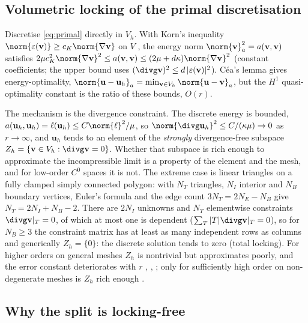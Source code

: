 \documentclass[11pt]{article}
\numberwithin{equation}{section}
\theoremstyle{remark}
\newcommand{\eps}{\varepsilon}
\newcommand{\vu}{\mathbf{u}}
\newcommand{\vv}{\mathbf{v}}
\newcommand{\Vh}{V_h}
\begin{document}
\subsection{Volumetric locking of the primal discretisation}
\label{sec:locking}

Discretise \eqref{eq:primal} directly in $\Vh$. With Korn's inequality
$\norm{\eps(\vv)}\ge c_K\norm{\nabla\vv}$ on $V$
\cite[\S11.2]{BrennerScott}, the energy norm $\norm{\vv}_a^2 = a(\vv,\vv)$
satisfies $2\mu c_K^2\norm{\nabla\vv}^2\le a(\vv,\vv)\le(2\mu +
d\kappa)\norm{\nabla\vv}^2$ (constant coefficients; the upper bound uses
$(\divg\vv)^2\le d\,|\eps(\vv)|^2$). Céa's lemma gives energy-optimality,
$\norm{\vu - \vu_h}_a = \min_{\vv\in\Vh}\norm{\vu - \vv}_a$, but the
$H^1$ quasi-optimality constant is the ratio of these bounds, $O(r)$.

The mechanism is the divergence constraint. The discrete energy is
bounded, $a(\vu_h,\vu_h) = \ell(\vu_h)\le C\norm{\ell}^2/\mu$, so
$\norm{\divg\vu_h}^2\le C/(\kappa\mu)\to0$ as $r\to\infty$, and $\vu_h$
tends to an element of the \emph{strongly} divergence-free subspace $Z_h =
\{\vv\in\Vh : \divg\vv = 0\}$. Whether that subspace is rich enough to
approximate the incompressible limit is a property of the element and the
mesh, and for low-order $C^0$ spaces it is not. The extreme case is linear
triangles on a fully clamped simply connected polygon: with $N_T$
triangles, $N_I$ interior and $N_B$ boundary vertices, Euler's formula and
the edge count $3N_T = 2N_E - N_B$ give $N_T = 2N_I + N_B - 2$. There are
$2N_I$ unknowns and $N_T$ elementwise constraints $\divg\vv|_T = 0$, of
which at most one is dependent ($\sum_T|T|\divg\vv|_T = 0$), so for
$N_B\ge3$ the constraint matrix has at least as many independent rows as
columns and generically $Z_h = \{0\}$: the discrete solution tends to zero
(total locking). For higher orders on general meshes $Z_h$ is nontrivial
but approximates poorly, and the error constant deteriorates with $r$
\cite{BabuskaSuri1992}, \cite[\S11.3]{BrennerScott}, \cite[Ch.~VI
\S3]{Braess}; only for sufficiently high order on non-degenerate meshes is
$Z_h$ rich enough \cite{ScottVogelius1985}.

\subsection{Why the split is locking-free}
\label{sec:reduced}
\end{document}
